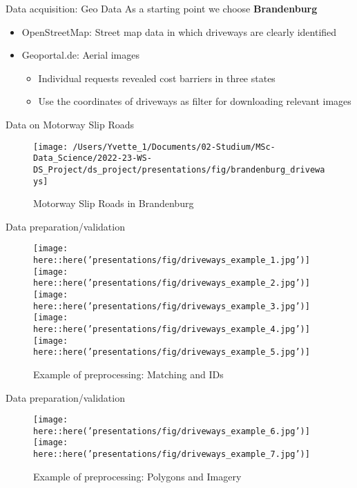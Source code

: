 \documentclass[
  ignorenonframetext,
]{beamer}
\begin{document}
\begin{frame}{Data acquisition: Geo Data}
\protect\hypertarget{data-acquisition-geo-data}{}
As a starting point we choose \textbf{Brandenburg}

\begin{itemize}
\item OpenStreetMap: Street map data in which driveways are clearly identified 
\item Geoportal.de: Aerial images %
  \begin{itemize}
    \item Individual requests revealed cost barriers in three states
    \item Use the coordinates of driveways as filter for downloading relevant images
  \end{itemize}
\end{itemize}
\end{frame}

\begin{frame}{Data on Motorway Slip Roads}
\protect\hypertarget{data-on-motorway-slip-roads}{}
\begin{figure}
\texttt{[image: /Users/Yvette\_1/Documents/02-Studium/MSc-Data\_Science/2022-23-WS-DS\_Project/ds\_project/presentations/fig/brandenburg\_driveways]} \caption{Motorway Slip Roads in Brandenburg}\label{fig:unnamed-chunk-3}
\end{figure}
\end{frame}

\begin{frame}{Data preparation/validation}
\protect\hypertarget{data-preparationvalidation}{}
\begin{figure}
\texttt{[image: here::here('presentations/fig/driveways\_example\_1.jpg')]}
\vline
\texttt{[image: here::here('presentations/fig/driveways\_example\_2.jpg')]}
\vline
\texttt{[image: here::here('presentations/fig/driveways\_example\_3.jpg')]}
\vline
\texttt{[image: here::here('presentations/fig/driveways\_example\_4.jpg')]}
\vline
\texttt{[image: here::here('presentations/fig/driveways\_example\_5.jpg')]}
\caption{Example of preprocessing: Matching and IDs}
\end{figure}
\end{frame}

\begin{frame}{Data preparation/validation}
\protect\hypertarget{data-preparationvalidation-1}{}
\begin{figure}
\texttt{[image: here::here('presentations/fig/driveways\_example\_6.jpg')]}
\hspace{1pt} \vline \hspace{1pt}
\texttt{[image: here::here('presentations/fig/driveways\_example\_7.jpg')]}
\caption{Example of preprocessing: Polygons and Imagery}
\end{figure}
\end{frame}
\end{document}
